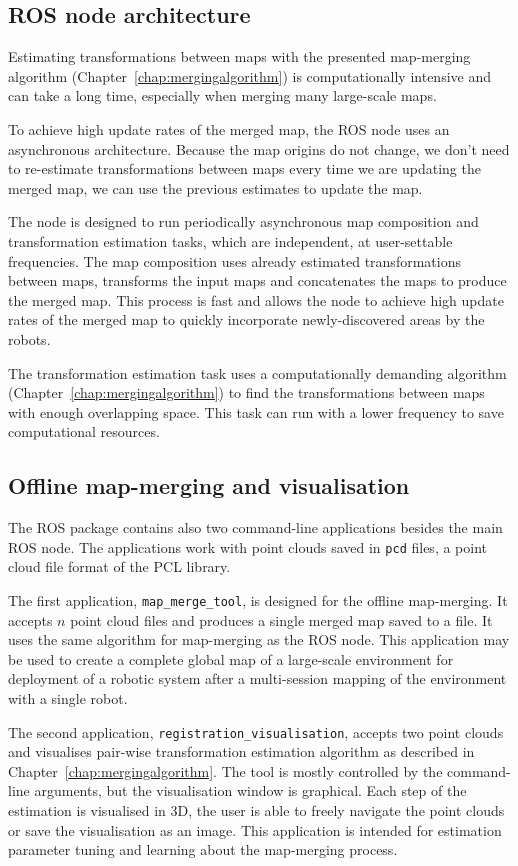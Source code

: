 \subsection{ROS node architecture}
\label{sec:node-architecture}

Estimating transformations between maps with the presented map-merging algorithm (Chapter~\ref{chap:mergingalgorithm}) is computationally intensive and can take a long time, especially when merging many large-scale maps.

To achieve high update rates of the merged map, the \gls{ROS} node uses an asynchronous architecture. Because the map origins do not change, we don't need to re-estimate transformations between maps every time we are updating the merged map, we can use the previous estimates to update the map.

The node is designed to run periodically asynchronous map composition and transformation estimation tasks, which are independent, at user-settable frequencies. The map composition uses already estimated transformations between maps, transforms the input maps and concatenates the maps to produce the merged map. This process is fast and allows the node to achieve high update rates of the merged map to quickly incorporate newly-discovered areas by the robots.

The transformation estimation task uses a computationally demanding algorithm (Chapter~\ref{chap:mergingalgorithm}) to find the transformations between maps with enough overlapping space. This task can run with a lower frequency to save computational resources.

\subsection{Offline map-merging and visualisation}
\label{sec:commandline-tools}

The \gls{ROS} package contains also two command-line applications besides the main \gls{ROS} node. The applications work with point clouds saved in \texttt{pcd} files, a point cloud file format of the \gls{PCL} library.

The first application, \texttt{map\_merge\_tool}, is designed for the offline map-merging. It accepts $n$ point cloud files and produces a single merged map saved to a file. It uses the same algorithm for map-merging as the \gls{ROS} node. This application may be used to create a complete global map of a large-scale environment for deployment of a robotic system after a multi-session mapping of the environment with a single robot.

The second application, \texttt{registration\_visualisation}, accepts two point clouds and visualises pair-wise transformation estimation algorithm as described in Chapter~\ref{chap:mergingalgorithm}. The tool is mostly controlled by the command-line arguments, but the visualisation window is graphical. Each step of the estimation is visualised in \gls{3D}, the user is able to freely navigate the point clouds or save the visualisation as an image. This application is intended for estimation parameter tuning and learning about the map-merging process.

